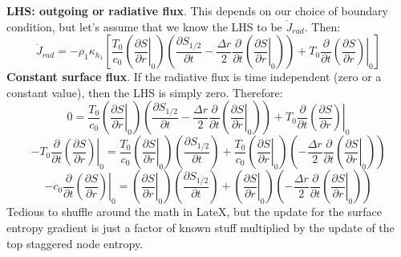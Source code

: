 \textbf{LHS: outgoing or radiative flux}.  This depends on our choice of boundary condition, but let's assume that we know the LHS to be $\dot{J}_{rad}$.  Then:
\begin{equation}
\dot{J}_{rad} = - \rho_1 \kappa_{h_1} \left[ \frac{T_0}{c_0} \left(\left.\frac{\partial S}{\partial r}\right|_0 \right) \left( \frac{\partial S_{1/2}}{\partial t} - \frac{\Delta r}{2} \frac{\partial}{\partial t} \left( \left. \frac{\partial S}{\partial r}\right|_0 \right) \right) + T_0 \frac{\partial}{\partial t} \left. \left(\frac{\partial S}{\partial r}\right) \right|_0  \right]
\end{equation}
\textbf{Constant surface flux}.  If the radiative flux is time independent (zero or a constant value), then the LHS is simply zero.  Therefore:
\begin{equation}
0 = \frac{T_0}{c_0} \left(\left.\frac{\partial S}{\partial r}\right|_0 \right) \left( \frac{\partial S_{1/2}}{\partial t} - \frac{\Delta r}{2} \frac{\partial}{\partial t} \left( \left. \frac{\partial S}{\partial r}\right|_0 \right) \right) + T_0 \frac{\partial}{\partial t} \left. \left(\frac{\partial S}{\partial r}\right) \right|_0
\end{equation}
\begin{equation}
- T_0 \frac{\partial}{\partial t} \left. \left(\frac{\partial S}{\partial r}\right) \right|_0 = \frac{T_0}{c_0} \left(\left.\frac{\partial S}{\partial r}\right|_0 \right) \left( \frac{\partial S_{1/2}}{\partial t} \right) + \frac{T_0}{c_0} \left(\left.\frac{\partial S}{\partial r}\right|_0 \right) \left( - \frac{\Delta r}{2} \frac{\partial}{\partial t} \left( \left. \frac{\partial S}{\partial r}\right|_0 \right) \right)
\end{equation}
\begin{equation}
- c_0 \frac{\partial}{\partial t} \left. \left(\frac{\partial S}{\partial r}\right) \right|_0 = \left(\left.\frac{\partial S}{\partial r}\right|_0 \right) \left( \frac{\partial S_{1/2}}{\partial t} \right) + \left(\left.\frac{\partial S}{\partial r}\right|_0 \right) \left( - \frac{\Delta r}{2} \frac{\partial}{\partial t} \left( \left. \frac{\partial S}{\partial r}\right|_0 \right) \right)
\end{equation}
Tedious to shuffle around the math in LateX, but the update for the surface entropy gradient is just a factor of known stuff multiplied by the update of the top staggered node entropy.
